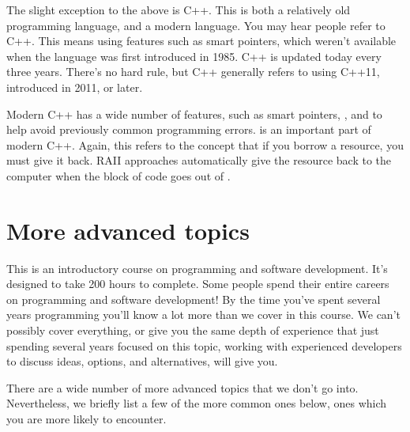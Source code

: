 \documentclass[letterpaper,10pt,british]{sphinxmanual}
\begin{document}
\sphinxAtStartPar
The slight exception to the above is C++. This is both a relatively old programming language, and a modern language. You may hear people refer to  C++. This means using features such as smart pointers, which weren’t available when the language was first introduced in 1985. C++ is updated today every three years. There’s no hard rule, but  C++ generally refers to using C++11, introduced in 2011, or later.

\sphinxAtStartPar
Modern C++ has a wide number of features, such as smart pointers, , and  to help avoid previously common programming errors.  is an important part of modern C++. Again, this refers to the concept that if you borrow a resource, you must give it back. RAII approaches automatically give the resource back to the computer when the block of code goes out of {\hyperref[\detokenize{chapters/programming_fundamentals/scope:scope}]{}}.

\sphinxstepscope


\section{More advanced topics}
\label{\detokenize{chapters/programming_fundamentals/advanced_topics:more-advanced-topics}}\label{\detokenize{chapters/programming_fundamentals/advanced_topics::doc}}
\sphinxAtStartPar
This is an introductory course on programming and software development. It’s designed to take 200 hours to complete. Some people spend their entire careers on programming and software development! By the time you’ve spent several years programming you’ll know a lot more than we cover in this course. We can’t possibly cover everything, or give you the same depth of experience that just spending several years focused on this topic, working with experienced developers to discuss ideas, options, and alternatives, will give you.

\sphinxAtStartPar
There are a wide number of more advanced topics that we don’t go into. Nevertheless, we briefly list a few of the more common ones below, ones which you are more likely to encounter.
\end{document}
